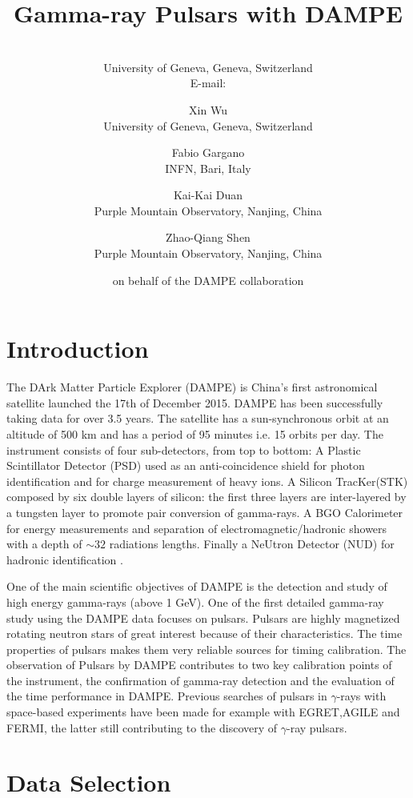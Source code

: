 \documentclass{PoS}
\title{Gamma-ray Pulsars with DAMPE}
\author{\speaker{Maria Munoz}\\
        University of Geneva, Geneva, Switzerland\\
        E-mail: \email{maria.munoz@unige.ch}}
\author{Xin Wu\\
        University of Geneva, Geneva, Switzerland}
\author{Fabio Gargano\\
        INFN, Bari, Italy}
\author{Kai-Kai Duan\\
        Purple Mountain Observatory, Nanjing, China}
\author{Zhao-Qiang Shen\\
        Purple Mountain Observatory, Nanjing, China}
\author{on behalf of the DAMPE collaboration}
\begin{document}


\section{Introduction}


The DArk Matter Particle Explorer (DAMPE) is China's first astronomical satellite launched the 17th of December 2015. DAMPE has been successfully taking data for over 3.5 years.
The satellite has a sun-synchronous orbit at an altitude of  500 km and  has a period of 95 minutes i.e. 15 orbits per day.
The instrument consists of four sub-detectors, from top to bottom: A Plastic Scintillator Detector (PSD) used as an anti-coincidence shield for photon identification and for charge measurement of heavy ions.
A Silicon TracKer(STK) composed by six double layers of silicon: the first three layers are inter-layered  by a tungsten layer to promote pair conversion of gamma-rays.  A BGO Calorimeter for energy measurements and separation of electromagnetic/hadronic showers with a depth of $\sim 32$ radiations lengths. Finally a NeUtron Detector (NUD) for  hadronic identification \cite{dampe-mision}.

One of the main scientific objectives of DAMPE is the detection and study of  high energy gamma-rays (above 1 GeV). One of the first detailed gamma-ray study using the DAMPE data focuses on pulsars. Pulsars are highly magnetized rotating neutron stars of great interest because of their characteristics. The time  properties of pulsars makes them very reliable sources for timing calibration. The observation of Pulsars by DAMPE contributes to two key calibration points of the instrument, the confirmation of gamma-ray detection and the  evaluation of the time  performance in DAMPE.
Previous searches of pulsars  in  $\gamma$-rays  with space-based experiments have been made for example  with   EGRET,AGILE and  FERMI\cite{2catalogfermi}, the latter still contributing to the discovery of $\gamma$-ray pulsars.


\section{Data Selection}
\end{document}
